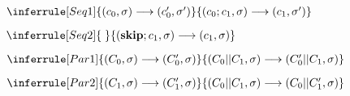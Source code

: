 \documentclass[UTF8, 8pt, a4paper ]{ctexart}
\newcommand\xrsquigarrow[1]{%
	\mathrel{%
		\begin{tikzpicture}[%
			baseline={(current bounding box.south)}
			]
			\node[%
			,inner sep=.44ex
			,align=center
			] (tmp) {$\scriptstyle #1$};
			\path[%
			,draw,<-
			,decorate,decoration={%
				,zigzag
				,amplitude=0.7pt
				,segment length=1.2mm,pre length=3.5pt
			}
			]
			(tmp.south east) -- (tmp.south west);
			\path[draw] ($ (tmp.south west)+(0,-0.7mm) $)--($ (tmp.south west)+(0,0.7mm) $);
			
		\end{tikzpicture}
	}
}
\newcommand{\addrSet}{\mathcal{A}}
\begin{document}
\begin{small}
\begin{center}
		$
		\inferrule[Seq1]
		{ (c_0, \sigma) \longrightarrow (c_0', \sigma') }
		{ (c_0;c_1, \sigma) \longrightarrow (c_1, \sigma') }
		$
		
		\kspace

		$
		\inferrule[Seq2]
		{\;}
		{ (\textbf{skip};c_1, \sigma) \longrightarrow (c_1, \sigma) }
		$

		\kspace
		$
		\inferrule[Par1]  %
		{ (C_0, \sigma) \longrightarrow (C_0', \sigma)}
		{ (C_0 || C_1, \sigma) \longrightarrow (C_0' || C_1, \sigma)}
		$
		\kspace

		$
		\inferrule[Par2]  %
		{ (C_1, \sigma) \longrightarrow (C_1', \sigma)}
		{ (C_0 || C_1, \sigma) \longrightarrow (C_0 || C_1', \sigma)}
		$

	\end{center}

	

		
	
	
	
	
	

\end{small}
\end{document}
